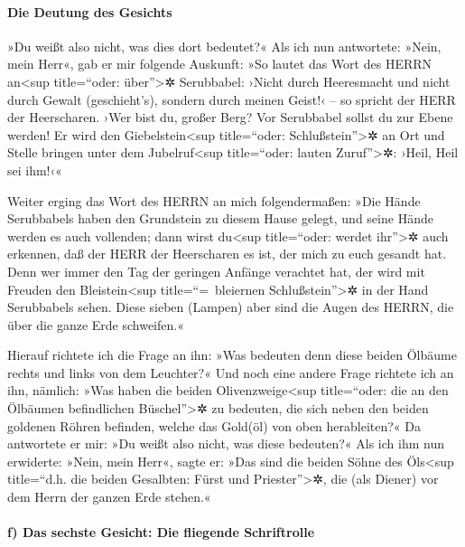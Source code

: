 \hypertarget{die-deutung-des-gesichts}{%
\paragraph{Die Deutung des Gesichts}\label{die-deutung-des-gesichts}}

»Du weißt also nicht, was dies dort bedeutet?« Als ich nun antwortete:
»Nein, mein Herr«,  gab er mir folgende Auskunft: »So
lautet das Wort des HERRN an\textless sup title=``oder:
über''\textgreater✲ Serubbabel: ›Nicht durch Heeresmacht und nicht durch
Gewalt (geschieht's), sondern durch meinen Geist!‹ -- so spricht der
HERR der Heerscharen.  ›Wer bist du, großer Berg? Vor
Serubbabel sollst du zur Ebene werden! Er wird den
Giebelstein\textless sup title=``oder: Schlußstein''\textgreater✲ an Ort
und Stelle bringen unter dem Jubelruf\textless sup title=``oder: lauten
Zuruf''\textgreater✲: ›Heil, Heil sei ihm!‹«

 Weiter erging das Wort des HERRN an mich folgendermaßen:
 »Die Hände Serubbabels haben den Grundstein zu diesem
Hause gelegt, und seine Hände werden es auch vollenden; dann wirst
du\textless sup title=``oder: werdet ihr''\textgreater✲ auch erkennen,
daß der HERR der Heerscharen es ist, der mich zu euch gesandt hat.
 Denn wer immer den Tag der geringen Anfänge verachtet
hat, der wird mit Freuden den Bleistein\textless sup title=``=~bleiernen
Schlußstein''\textgreater✲ in der Hand Serubbabels sehen. Diese sieben
(Lampen) aber sind die Augen des HERRN, die über die ganze Erde
schweifen.«

 Hierauf richtete ich die Frage an ihn: »Was bedeuten
denn diese beiden Ölbäume rechts und links von dem Leuchter?«
 Und noch eine andere Frage richtete ich an ihn, nämlich:
»Was haben die beiden Olivenzweige\textless sup title=``oder: die an den
Ölbäumen befindlichen Büschel''\textgreater✲ zu bedeuten, die sich neben
den beiden goldenen Röhren befinden, welche das Gold(öl) von oben
herableiten?«  Da antwortete er mir: »Du weißt also
nicht, was diese bedeuten?« Als ich ihm nun erwiderte: »Nein, mein
Herr«,  sagte er: »Das sind die beiden Söhne des
Öls\textless sup title=``d.h. die beiden Gesalbten: Fürst und
Priester''\textgreater✲, die (als Diener) vor dem Herrn der ganzen Erde
stehen.«

\hypertarget{f-das-sechste-gesicht-die-fliegende-schriftrolle}{%
\paragraph{f) Das sechste Gesicht: Die fliegende
Schriftrolle}\label{f-das-sechste-gesicht-die-fliegende-schriftrolle}}

